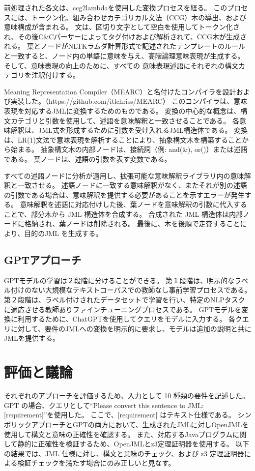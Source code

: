 \documentclass[uplatex, twocolumn,10pt]{jsarticle} %
\begin{document}
前処理された各文は、ccg2lambda\cite{3}を使用した変換プロセスを経る。
このプロセスには、トークン化、組み合わせカテゴリカル文法（CCG）木の導出、および意味構成が含まれる。
文は、区切り文字として空白を使用してトークン化され、その後C\&Cパーサーによってタグ付けおよび解析されて、CCG木が生成される。
葉とノードがNLTK\cite{7}ラムダ計算形式で記述されたテンプレートのルールと一致すると、ノード内の単語に意味を与え、高階論理意味表現が生成する。
そして、意味表現の向上のために、すべての 意味表現述語にそれぞれの構文カテゴリを注釈付けする。

Meaning Representation Compiler（MEARC）と名付けたコンパイラを設計および実装した。（https://github.com/itlchriss/MEARC）
このコンパイラは、意味表現を対応するJMLに変換するためのものである。
変換の中心的な概念は、構文カテゴリと引数を使用して、述語を意味解釈と一致させることである。
各意味解釈は、JML式を形成するために引数を受け入れるJML構造体である。
変換は、LR(1)文法で意味表現を解析することにより、抽象構文木を構築することから始まる。
抽象構文木の内部ノードは、接続詞（例: and(\&), or(\textbar)）または述語である。
葉ノードは、述語の引数を表す変数である。

すべての述語ノードに分析が適用し、拡張可能な意味解釈ライブラリ内の意味解釈と一致させる。
述語ノードに一致する意味解釈がなく、またそれが別の述語の引数である場合は、意味解釈を提供する必要があることを示すエラーが発生する。
意味解釈を述語に対応付けした後、葉ノードを意味解釈の引数に代入することで、部分木から JML 構造体を合成する。
合成された JML 構造体は内部ノードに格納され、葉ノードは削除される。
最後に、木を後順で走査することにより、目的のJML を生成する。

\subsection{GPTアプローチ}
GPTモデル\cite{2}の学習は２段階に分けることができる。
第１段階は、明示的なラベル付けのない大規模なテキストコーパスでの教師なし事前学習プロセスである。
第２段階は、ラベル付けされたデータセットで学習を行い、特定のNLPタスクに適応させる教師ありファインチューニングプロセスである。
GPTモデルを変換に利用するために、ChatGPTを使用してクエリをモデルに入力する。
各クエリに対して、要件のJMLへの変換を明示的に要求し、モデルは追加の説明と共にJMLを提供する。

\section{評価と議論}
\label{sec:evaluation}
それぞれのアプローチを評価するため、入力として 10 種類の要件を記述した。
GPT の場合、クエリとして“Please convert this sentence to JML: [requirement]”を使用した。
ここで、[requirement] はテキスト仕様である。
シンボリックアプローチとGPTの両方において、生成されたJMLに対しOpenJML\cite{4}を使用して構文と意味の正確性を確認する。
また、対応するJavaプログラムに関して静的に正確性を検証するため、OpenJMLとz3\cite{5}定理証明器を使用する。
以下の結果では、JML 仕様に対し、構文と意味のチェック、および z3 定理証明器による検証チェックを満たす場合にのみ正しいと見なす。
\end{document}
